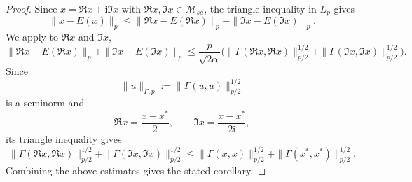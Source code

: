 \documentclass[10pt,a4paper]{amsart}
\newcommand{\M}{\mathcal{M}}
\begin{document}
\begin{proof}
Since $x=\Re x+\mathrm i\Im x$ with $\Re x,\Im x\in\M_{sa}$, the triangle inequality in $L_p$ gives
\[
\|x-E(x)\|_p
\le
\|\Re x-E(\Re x)\|_p
+
\|\Im x-E(\Im x)\|_p.
\]
We apply  to $\Re x$ and $\Im x$,
\[
\|\Re x-E(\Re x)\|_p
+
\|\Im x-E(\Im x)\|_p
\le
\frac p{\sqrt{2\alpha}}
\bigl(
\|\Gamma(\Re x,\Re x)\|_{p/2}^{1/2}
+
\|\Gamma(\Im x,\Im x)\|_{p/2}^{1/2}
\bigr).
\]
Since
\[
\|u\|_{\Gamma,p}:=\|\Gamma(u,u)\|_{p/2}^{1/2}
\]
is a seminorm and
\[
\Re x=\frac{x+x^*}{2},
\qquad
\Im x=\frac{x-x^*}{2\mathrm i},
\]
its triangle inequality gives
\[
\|\Gamma(\Re x,\Re x)\|_{p/2}^{1/2}
+
\|\Gamma(\Im x,\Im x)\|_{p/2}^{1/2}
\le
\|\Gamma(x,x)\|_{p/2}^{1/2}
+
\|\Gamma(x^*,x^*)\|_{p/2}^{1/2}.
\]
Combining the above estimates gives the stated corollary.
\end{proof}
\end{document}
